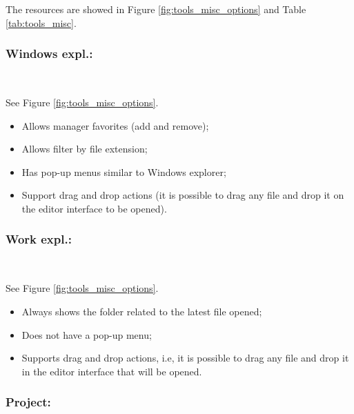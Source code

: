 The resources are showed in
Figure \ref{fig:tools_misc_options} and
Table \ref{tab:tools_misc}.


\hypertarget{working_tools_misc_windowsexpl}{}
\subsubsection{Windows expl.:}\\

See Figure \ref{fig:tools_misc_options}.

\begin{itemize}
  \item Allows manager favorites (add and remove);
  \item Allows filter by file extension;
  \item Has pop-up menus similar to Windows explorer;
  \item Support drag and drop actions (it is possible to drag
    any file and drop it on the editor interface to be opened).
\end{itemize}


\hypertarget{working_tools_misc_workexpl}{}
\subsubsection{Work expl.:}\\

See Figure \ref{fig:tools_misc_options}.

\begin{itemize}
  \item Always shows the folder related to the latest file opened;
  \item Does not have a pop-up menu;
  \item Supports drag and drop actions, i.e, it is possible to drag any
    file and drop it in the editor interface that will be opened.
\end{itemize}


\hypertarget{working_tools_misc_project}{}
\subsubsection{Project:}\\

